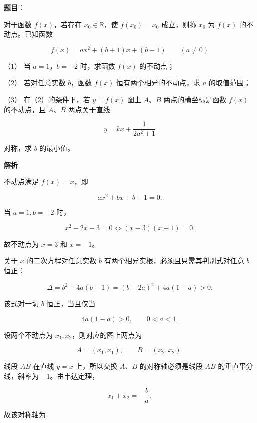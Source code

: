 \begin{answer}

\textbf{题目}：

对于函数 $f(x)$，若存在 $x_0\in\mathbb R$，使 $f(x_0)=x_0$ 成立，则称 $x_0$ 为 $f(x)$ 的不动点。已知函数

\nopagebreak[4]
\[
f(x)=ax^2+(b+1)x+(b-1)\qquad(a\ne0)
\]

（1） 当 $a=1$，$b=-2$ 时，求函数 $f(x)$ 的不动点；

（2） 若对任意实数 $b$，函数 $f(x)$ 恒有两个相异的不动点，求 $a$ 的取值范围；

（3） 在（2）的条件下，若 $y=f(x)$ 图上 $A\text{、}B$ 两点的横坐标是函数 $f(x)$ 的不动点，且 $A\text{、}B$ 两点关于直线

\nopagebreak[4]
\[
y=kx+\frac1{2a^2+1}
\]

对称，求 $b$ 的最小值。

\textbf{解析}


不动点满足 $f(x)=x$，即

\nopagebreak[4]
\[
ax^2+bx+b-1=0.
\]

当 $a=1,b=-2$ 时，

\nopagebreak[4]
\[
x^2-2x-3=0
\Longleftrightarrow
(x-3)(x+1)=0.
\]

故不动点为 $x=3$ 和 $x=-1$。


关于 $x$ 的二次方程对任意实数 $b$ 有两个相异实根，必须且只需其判别式对任意 $b$ 恒正：

\nopagebreak[4]
\[
\Delta=b^2-4a(b-1)
=(b-2a)^2+4a(1-a)>0.
\]

该式对一切 $b$ 恒正，当且仅当

\nopagebreak[4]
\[
4a(1-a)>0,
\qquad 0<a<1.
\]


设两个不动点为 $x_1,x_2$，则对应的图上两点为

\nopagebreak[4]
\[
A=(x_1,x_1),\qquad B=(x_2,x_2).
\]

线段 $AB$ 在直线 $y=x$ 上，所以交换 $A\text{、}B$ 的对称轴必须是线段 $AB$ 的垂直平分线，斜率为 $-1$。由韦达定理，

\nopagebreak[4]
\[
x_1+x_2=-\frac ba,
\]

故该对称轴为


\end{answer}
